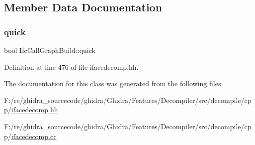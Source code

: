 \subsection{Member Data Documentation}
\mbox{\label{class_ifc_call_graph_build_a8ed330d968150ce54b6dcf6643277b19}} 
\subsubsection{\texorpdfstring{quick}{quick}}
{\footnotesize\ttfamily bool Ifc\+Call\+Graph\+Build\+::quick\hspace{0.3cm}{\ttfamily [protected]}}



Definition at line 476 of file ifacedecomp.\+hh.



The documentation for this class was generated from the following files\+:\begin{DoxyCompactItemize}
\item 
F\+:/re/ghidra\+\_\+sourcecode/ghidra/\+Ghidra/\+Features/\+Decompiler/src/decompile/cpp/\mbox{\hyperlink{ifacedecomp_8hh}{ifacedecomp.\+hh}}\item 
F\+:/re/ghidra\+\_\+sourcecode/ghidra/\+Ghidra/\+Features/\+Decompiler/src/decompile/cpp/\mbox{\hyperlink{ifacedecomp_8cc}{ifacedecomp.\+cc}}\end{DoxyCompactItemize}

